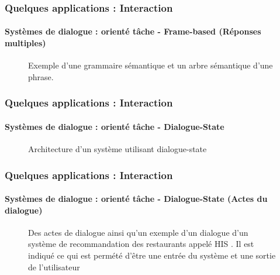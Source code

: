 \documentclass[xcolor=table]{beamer}
\begin{document}
\begin{frame}
	\frametitle{Quelques applications : Interaction}
	\framesubtitle{Systèmes de dialogue : orienté tâche - Frame-based (Réponses multiples)}
	
	\begin{figure}
		\centering
		
		\caption{Exemple d'une grammaire sémantique et un arbre sémantique d'une phrase. \cite{2020-jurafsky-martin}}
	\end{figure}
	
\end{frame}

\begin{frame}
	\frametitle{Quelques applications : Interaction}
	\framesubtitle{Systèmes de dialogue : orienté tâche - Dialogue-State}
	
	\begin{figure}
		\centering
		\caption{Architecture d'un système utilisant dialogue-state \cite{2016-williams-al}}
	\end{figure}
	
\end{frame}

\begin{frame}
	\frametitle{Quelques applications : Interaction}
	\framesubtitle{Systèmes de dialogue : orienté tâche - Dialogue-State (Actes du dialogue)}
	
	\vspace{-6pt}
	\begin{figure}
		\centering
		
		\vspace{-6pt}
		\caption{Des actes de dialogue ainsi qu'un exemple d'un dialogue d'un système de recommandation des restaurants appelé HIS \cite{2010-young-al}. Il est indiqué ce qui est permété d'être une entrée du système et une sortie de l'utilisateur \cite{2020-jurafsky-martin}}
	\end{figure}
	
\end{frame}
\end{document}
